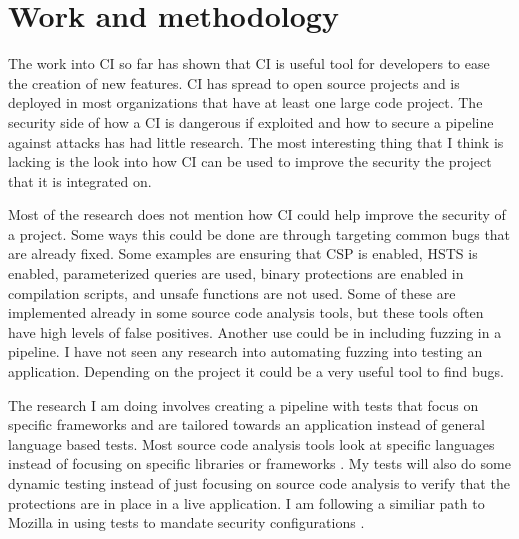 \section{Work and methodology}
	The work into CI so far has shown that CI is useful tool for developers to ease the creation of new features. CI has spread to open source projects and is deployed in most organizations that have 
    at least one large code project. The security side of how a CI is dangerous if exploited and how to secure a pipeline against attacks has had little research. The most interesting thing that I 
    think is lacking is the look into how CI can be used to improve the security the project that it is integrated on.
	
	Most of the research does not mention how CI could help improve the security of a project. Some ways this could be done are through targeting common bugs that are already fixed. Some examples
    are ensuring that CSP is enabled, HSTS is enabled, parameterized queries are used, binary protections are enabled in compilation scripts, and unsafe functions are not used. Some of these are
    implemented already in some source code analysis tools, but these tools often have high levels of false positives. Another use could be in including fuzzing in a pipeline. I have not seen any
    research into automating fuzzing into testing an application. Depending on the project it could be a very useful tool to find bugs.

    The research I am doing involves creating a pipeline with tests that focus on specific frameworks and are tailored towards an application instead of general language based tests. Most source
    code analysis tools look at specific languages instead of focusing on specific libraries or frameworks \cite{bandit, findbugs, findsecbugs}. My tests will also do some dynamic testing
    instead of just focusing on source code analysis to verify that the protections are in place in a live application. I am following a similiar path to Mozilla in using tests to mandate security
    configurations \cite{Vehent}.
